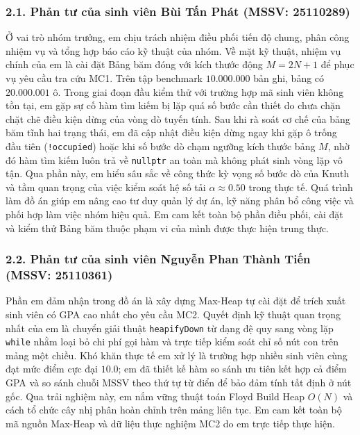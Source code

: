 \documentclass[14pt,a4paper]{extarticle}
\begin{document}
\subsubsection*{2.1. Phản tư của sinh viên Bùi Tấn Phát (MSSV: 25110289)}
{}
Ở vai trò nhóm trưởng, em chịu trách nhiệm điều phối tiến độ chung, phân công nhiệm vụ và tổng hợp báo cáo kỹ thuật của nhóm. Về mặt kỹ thuật, nhiệm vụ chính của em là cài đặt Bảng băm đóng với kích thước động $M = 2N + 1$ để phục vụ yêu cầu tra cứu MC1. Trên tập benchmark $10.000.000$ bản ghi, bảng có $20.000.001$ ô. Trong giai đoạn đầu kiểm thử với trường hợp mã sinh viên không tồn tại, em gặp sự cố hàm tìm kiếm bị lặp quá số bước cần thiết do chưa chặn chặt chẽ điều kiện dừng của vòng dò tuyến tính. Sau khi rà soát cơ chế của bảng băm tĩnh hai trạng thái, em đã cập nhật điều kiện dừng ngay khi gặp ô trống đầu tiên (\texttt{!occupied}) hoặc khi số bước dò chạm ngưỡng kích thước bảng $M$, nhờ đó hàm tìm kiếm luôn trả về \texttt{nullptr} an toàn mà không phát sinh vòng lặp vô tận. Qua phần này, em hiểu sâu sắc về công thức kỳ vọng số bước dò của Knuth và tầm quan trọng của việc kiểm soát hệ số tải $\alpha \approx 0.50$ trong thực tế. Quá trình làm đồ án giúp em nâng cao tư duy quản lý dự án, kỹ năng phân bổ công việc và phối hợp làm việc nhóm hiệu quả. Em cam kết toàn bộ phần điều phối, cài đặt và kiểm thử Bảng băm thuộc phạm vi của mình được thực hiện trung thực.

\subsubsection*{2.2. Phản tư của sinh viên Nguyễn Phan Thành Tiến (MSSV: 25110361)}
{}
Phần em đảm nhận trong đồ án là xây dựng Max-Heap tự cài đặt để trích xuất sinh viên có GPA cao nhất cho yêu cầu MC2. Quyết định kỹ thuật quan trọng nhất của em là chuyển giải thuật \texttt{heapifyDown} từ dạng đệ quy sang vòng lặp \texttt{while} nhằm loại bỏ chi phí gọi hàm và trực tiếp kiểm soát chỉ số nút con trên mảng một chiều. Khó khăn thực tế em xử lý là trường hợp nhiều sinh viên cùng đạt mức điểm cực đại $10.0$; em đã thiết kế hàm so sánh ưu tiên kết hợp cả điểm GPA và so sánh chuỗi MSSV theo thứ tự từ điển để bảo đảm tính tất định ở nút gốc. Qua trải nghiệm này, em nắm vững thuật toán Floyd Build Heap $O(N)$ và cách tổ chức cây nhị phân hoàn chỉnh trên mảng liên tục. Em cam kết toàn bộ mã nguồn Max-Heap và dữ liệu thực nghiệm MC2 do em trực tiếp thực hiện.
\end{document}
